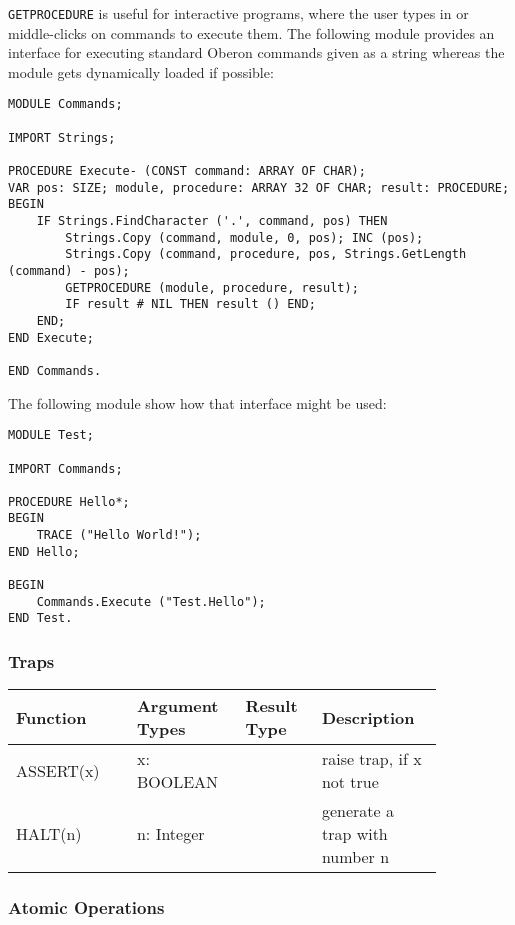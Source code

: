 \documentclass[a4wide,11pt]{article}
\begin{document}
\begin{annotation}
\texttt{GETPROCEDURE} is useful for interactive programs, where the user types in or middle-clicks on commands to execute them. The following module provides an interface for executing standard Oberon commands given as a string whereas the module gets dynamically loaded if possible:
\begin{lstlisting}[style=example]
MODULE Commands;

IMPORT Strings;

PROCEDURE Execute- (CONST command: ARRAY OF CHAR);
VAR pos: SIZE; module, procedure: ARRAY 32 OF CHAR; result: PROCEDURE;
BEGIN
    IF Strings.FindCharacter ('.', command, pos) THEN
        Strings.Copy (command, module, 0, pos); INC (pos);
        Strings.Copy (command, procedure, pos, Strings.GetLength (command) - pos);
        GETPROCEDURE (module, procedure, result);
        IF result # NIL THEN result () END;
    END;
END Execute;

END Commands.
\end{lstlisting}

The following module show how that interface might be used:
\begin{lstlisting}[style=example]
MODULE Test;

IMPORT Commands;

PROCEDURE Hello*;
BEGIN
    TRACE ("Hello World!");
END Hello;

BEGIN
    Commands.Execute ("Test.Hello");
END Test.
\end{lstlisting}
\end{annotation}

\subsubsection{Traps}
\begin{longtable}{|p{0.25\linewidth}|p{0.2\linewidth}|p{0.15\linewidth}|p{0.25\linewidth}|}
\hline
Function & Argument Types & Result Type & Description \\
\hline\hline
\endhead
ASSERT(x) & x: BOOLEAN & & raise trap, if x not true \\
HALT(n) & n: Integer & & generate a trap with number n \\
\hline
\end{longtable}

\subsubsection{Atomic Operations}
\end{document}

